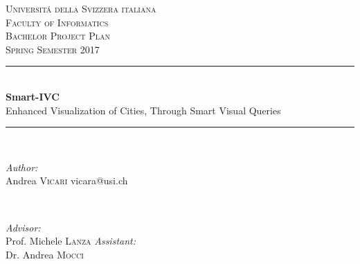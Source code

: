 \documentclass[a4paper]{article}
\begin{document}
\begin{titlepage}

\newcommand{\HRule}{\rule{\linewidth}{0.5mm}} %

\center %
 
\textsc{\LARGE Universit\'a della Svizzera italiana}\\[1.5cm] %
\textsc{\Large Faculty of Informatics}\\[0.5cm] %
\textsc{\large Bachelor Project Plan\\Spring Semester 2017}\\[0.5cm] %


\HRule \\[0.4cm]
{ \Huge \bfseries Smart-IVC}\\[0.4cm] %
{ \huge Enhanced Visualization of Cities, Through Smart Visual Queries}
\HRule \\[1.5cm]
 

\begin{minipage}{0.4\textwidth}
\begin{flushleft} \large
\emph{Author:}\\
Andrea \textsc{Vicari} %
vicara@usi.ch %
\end{flushleft}
\end{minipage}
~
\begin{minipage}{0.4\textwidth}
\begin{flushright} \large
\emph{Advisor:} \\
Prof. Michele \textsc{Lanza} %
\emph{Assistant:} \\
Dr. Andrea \textsc{Mocci} %
\end{flushright}
\end{minipage}\\[4cm]


\end{titlepage}
\end{document}

